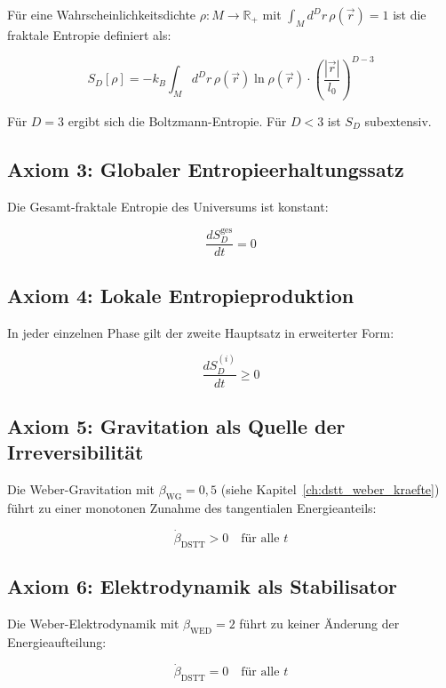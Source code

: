 Für eine Wahrscheinlichkeitsdichte $\rho: M \to \mathbb{R}_+$ mit 
$\int_M d^D r \, \rho(\vec{r}) = 1$ ist die fraktale Entropie definiert als:

\[
S_D[\rho] = -k_B \int_M d^D r \, \rho(\vec{r}) \ln \rho(\vec{r}) \cdot \left( \frac{|\vec{r}|}{l_0} \right)^{D-3} \tag{L.2}
\]

Für $D = 3$ ergibt sich die Boltzmann-Entropie. Für $D < 3$ ist $S_D$ subextensiv.

\subsection{Axiom 3: Globaler Entropieerhaltungssatz}
\label{sub:fraktale_entropie_axiom3}

Die Gesamt-fraktale Entropie des Universums ist konstant:

\[
\frac{dS_D^{\text{ges}}}{dt} = 0 \tag{L.3}
\]

\subsection{Axiom 4: Lokale Entropieproduktion}
\label{sub:fraktale_entropie_axiom4}

In jeder einzelnen Phase gilt der zweite Hauptsatz in erweiterter Form:

\[
\frac{dS_D^{(i)}}{dt} \geq 0 \tag{L.4}
\]

\subsection{Axiom 5: Gravitation als Quelle der Irreversibilität}
\label{sub:fraktale_entropie_axiom5}

Die Weber-Gravitation mit $\beta_{\text{WG}} = 0,5$ (siehe Kapitel~\ref{ch:dstt_weber_kraefte}) führt zu einer monotonen Zunahme 
des tangentialen Energieanteils:

\[
\dot{\beta}_{\text{DSTT}} > 0 \quad \text{für alle } t \tag{L.5}
\]

\subsection{Axiom 6: Elektrodynamik als Stabilisator}
\label{sub:fraktale_entropie_axiom6}

Die Weber-Elektrodynamik mit $\beta_{\text{WED}} = 2$ führt zu keiner Änderung der 
Energieaufteilung:

\[
\dot{\beta}_{\text{DSTT}} = 0 \quad \text{für alle } t \tag{L.6}
\]

